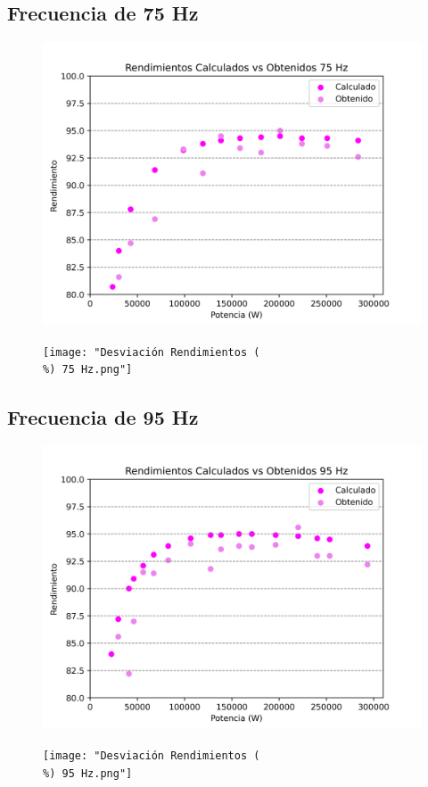 \documentclass[12pt]{article}
\begin{document}
\subsection{Frecuencia de 75 Hz}
\begin{figure}[H]
\centering
\includegraphics[width=0.6	extwidth]{"Rendimientos Calculados vs Obtenidos 75 Hz.png"}
\caption{}
\label{fig:}
\end{figure}
\begin{figure}[H]
\centering
\texttt{[image: "Desviación Rendimientos (\\\%) 75 Hz.png"]}
\caption{}
\label{fig:}
\end{figure}

\subsection{Frecuencia de 95 Hz}
\begin{figure}[H]
\centering
\includegraphics[width=0.6	extwidth]{"Rendimientos Calculados vs Obtenidos 95 Hz.png"}
\caption{}
\label{fig:}
\end{figure}
\begin{figure}[H]
\centering
\texttt{[image: "Desviación Rendimientos (\\\%) 95 Hz.png"]}
\caption{}
\label{fig:}
\end{figure}
\end{document}
